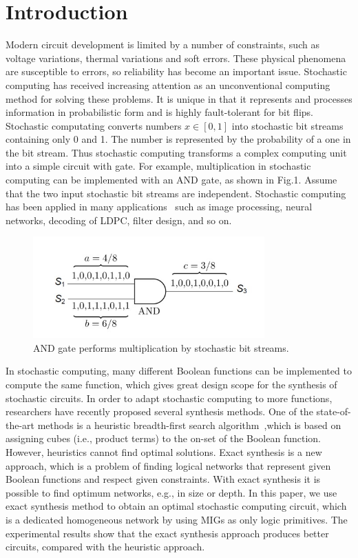 \documentclass[conference,letterpaper]{IEEEtran}
\begin{document}
\section*{Introduction}
Modern circuit development is limited by a number of constraints, such as voltage variations, thermal variations and soft errors. These physical phenomena are susceptible to errors, so reliability has become an important issue. Stochastic computing has received increasing attention as an unconventional computing method for solving these problems. It is unique in that it represents and processes information in probabilistic form and is highly fault-tolerant for bit flips. Stochastic computating converts numbers $x \in[0,1]$ into stochastic bit streams containing only 0 and 1. The number is represented by the probability of a one in the bit stream. Thus stochastic computing transforms a complex computing unit into a simple  circuit with gate. For example, multiplication in stochastic computing can be implemented with an AND gate, as shown in Fig.1.  Assume
that the two input stochastic bit streams are independent. Stochastic computing has been applied in many applications~\cite{1} such as image processing, neural networks, decoding of LDPC, filter design, and so on.

\begin{figure}[htbp]
	\centering
	\includegraphics[width=3.5in]{fig/AND_gate.jpg}	
	\caption{AND gate performs multiplication by stochastic bit streams.} 
\end{figure}

In stochastic computing, many different Boolean functions can be implemented to compute the same function, which gives great design scope for the synthesis of stochastic circuits. In order to adapt stochastic computing to more functions, researchers have recently proposed several synthesis methods. One of the state-of-the-art methods is a heuristic breadth-first search algorithm~\cite{2},which is based on assigning
cubes (i.e., product terms) to the on-set of the Boolean function. However, heuristics cannot find optimal solutions. Exact synthesis is a new approach, which is a problem of finding logical networks that represent given Boolean functions and respect given constraints. With exact synthesis it is possible to find optimum networks, e.g., in size or depth. In this paper, we use exact synthesis method to obtain an optimal stochastic computing circuit, which is a dedicated homogeneous network by using MIGs as only logic primitives. The experimental results show that the exact synthesis approach produces better circuits, compared with the heuristic approach.
\end{document}
